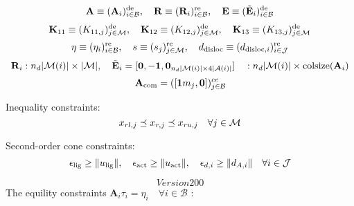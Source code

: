 \documentclass[a4paper,10pt]{article}
\begin{document}
\begin{landscape}
\begin{equation}
\end{equation}
\begin{equation}\notag
\mathbf{A} \equiv (\mathbf{A}_i)^\text{de}_{i \in \mathcal{B}}, \quad
\mathbf{R} \equiv (\mathbf{R}_i)^\text{re}_{i \in \mathcal{B}}, \quad
\mathbf{E} \equiv (\tilde{\mathbf{E}}_i)^\text{de}_{i \in \mathcal{B}}
\end{equation}
\begin{equation}\notag
\mathbf{K}_{11} \equiv (K_{11,j})^{\text{de}}_{j \in \mathcal{M}}, \quad
\mathbf{K}_{12} \equiv (K_{12,j})^{\text{de}}_{j \in \mathcal{M}}, \quad
\mathbf{K}_{13} \equiv (K_{13,j})^{\text{de}}_{j \in \mathcal{M}}
\end{equation}
\begin{equation}\notag
\eta             \equiv (\eta_i)^\text{re}_{i \in \mathcal{B}}, \quad
s                \equiv (s_j)^{\text{re}}_{j \in \mathcal{M}}, \quad
d_\text{disloc}  \equiv (d_{\text{disloc},i})^{\text{re}}_{i \in \mathcal{J}}
\end{equation}
\begin{equation}\notag
\mathbf{R}_i : n_d | \mathcal{M}(i) | \times |\mathcal{M}|, \quad
\tilde{\mathbf{E}}_i = [\mathbf{0},-\mathbf{1},\mathbf{0}_{n_d | \mathcal{M}(i) | \times 4|\mathcal{A}(i)|}] \quad : n_d | \mathcal{M}(i) | \times \text{colsize}(\mathbf{A}_i)
\end{equation}
\begin{equation}\notag
\mathbf{A}_\text{com} = ([ \mathbf{1}m_j, \mathbf{0} ])^{ce}_{j \in \mathcal{B}}
\end{equation}

\noindent Inequality constraints:
\begin{equation}\notag
x_{rl,j} \preceq x_{r,j} \preceq x_{ru,j} \quad \forall j\in \mathcal{M}
\end{equation}

\noindent Second-order cone constraints:
\begin{equation}\notag
\epsilon_\text{lig} \geq \| u_\text{lig} \|, \quad \epsilon_\text{act} \geq \| u_\text{act} \|, \quad
\epsilon_{d,i} \geq \| d_{A,i} \| \quad \forall i \in \mathcal{J}
\end{equation}

\[Version 200\]
\noindent The equility constraints $\mathbf{A}_i \tau_i = \eta_i \quad \forall i \in \mathcal{B}$ :


\end{landscape}
\end{document}
